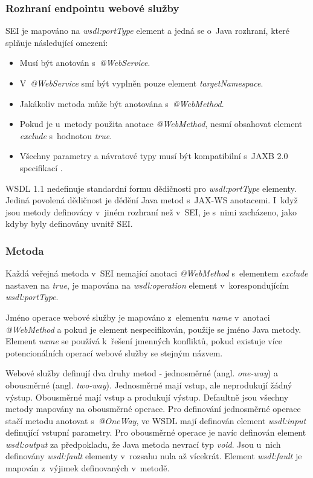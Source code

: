 \documentclass[11pt,twoside,a4paper]{book}
\begin{document}
\subsubsection{Rozhraní endpointu webové služby}
SEI je mapováno na {\em wsdl:portType} element a jedná se o~Java
rozhraní, které splňuje následující omezení:

\begin{itemize}
  \item Musí být anotován s~{\em @WebService}.
  \item V~{\em @WebService} smí být vyplněn pouze element {\em targetNamespace}.
  \item Jakákoliv metoda může být anotována s~{\em @WebMethod}.
  \item Pokud je u~metody použita anotace {\em @WebMethod}, nesmí obsahovat
  element {\em exclude} s~hodnotou {\em true}.
  \item Všechny parametry a návratové typy musí být kompatibilní s~JAXB 2.0
  specifikací \cite{JAXB20}.
\end{itemize}

WSDL 1.1 nedefinuje standardní formu dědičnosti pro {\em wsdl:portType}
elementy.
Jediná povolená dědičnost je dědění Java metod s~JAX-WS anotacemi. I~když jsou metody
definovány v~jiném rozhraní než v~SEI, je s~nimi zacházeno, jako kdyby byly
definovány uvnitř SEI.

\subsubsection{Metoda}

Každá veřejná metoda v~SEI nemající anotaci {\em @WebMethod} s~elementem {\em
exclude} nastaven na {\em true}, je mapována na {\em wsdl:operation} element
v~korespondujícím {\em wsdl:portType}.

Jméno operace webové služby je mapováno z~elementu {\em name} v~anotaci {\em
@WebMethod} a pokud je element nespecifikován, použije se jméno Java metody.
Element {\em name} se používá k~řešení jmenných konfliktů, pokud existuje více
potencionálních operací webové služby se stejným
názvem.

Webové služby definují dva druhy metod - jednosměrné (angl. {\em
one-way}) a obousměrné (angl. {\em two-way}).
Jednosměrné mají vstup, ale neprodukují žádný výstup. Obousměrné mají vstup a
produkují výstup. Defaultně jsou všechny metody mapovány na obousměrné operace.
Pro definování jednosměrné operace stačí metodu anotovat s~{\em @OneWay}, ve
WSDL mají definován element {\em wsdl:input} definující vstupní parametry. Pro
obousměrné operace je navíc definován element {\em wsdl:output} za předpokladu, že Java metoda nevrací typ {\em void}.
Jsou u~nich definovány {\em wsdl:fault} elementy v~rozsahu nula až
vícekrát.
Element {\em wsdl:fault} je mapován z~výjimek definovaných v~metodě.
\end{document}

